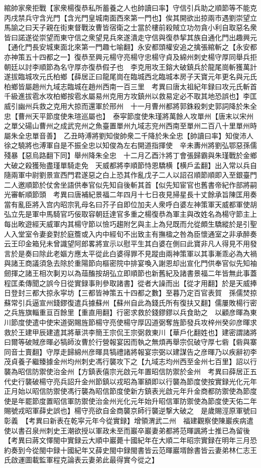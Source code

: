 綰帥家衆拒戰【家衆楊復恭私所蓄養之人也帥讀曰率】守信引兵助之順節等不能克丙戌禁兵守含光門【含光門皇城南面西來第一門也】俟其開欲出掠兩市遇劉崇望立馬諭之曰天子親在街東督戰汝曹皆宿衛之士當於樓前殺賊立功勿貪小利自取惡名衆皆曰諾遂從崇望而東守信之衆望見兵來遂潰走守信與復恭挈其族自通化門出趣興元【通化門長安城東面北來第一門趣七喻翻】永安都頭權安追之擒張綰斬之【永安都亦神策五十四都之一】復恭至興元楊守亮楊守忠楊守貞及綿州刺史楊守厚同舉兵拒朝廷以討李順節為名守厚亦復恭假子也　李克用攻王鎔大破鎮兵於龍尾崗斬獲萬計遂拔臨城攻元氏柏鄉【薛居正曰龍尾崗在臨城西北臨城本房子天寶元年更名與元氏柏鄉皆屬趙州九域志臨城在趙州西南一百三里　考異曰唐太祖紀年録曰攻元氏斬首千級進拔雹水攻柏鄉按雹水屬易州克用方攻鎮州以救易定必不取其地恐誤也】李匡威引幽州兵救之克用大掠而還軍於邢州　十一月曹州都將郭銖殺刺史郭詞降於朱全忠【曹州天平節度使朱瑄巡屬也】　泰寜節度使朱瑾將萬餘人攻單州【唐末以宋州之單父碭山曹州之成武兖州之魚臺置單州九域志兖州西南至單州二百八十里單州時屬朱全忠單音善】　乙丑時溥將劉知俊帥衆二千降於朱全忠【帥讀曰率】知俊沛人徐之驍將也溥軍自是不振全忠以知俊為左右開道指揮使　辛未夀州將劉弘鄂惡孫儒殘暴【惡烏路翻下同】舉州降朱全忠　十二月乙酉汴將丁會張歸霸與朱瑾戰於金鄉大破之殺獲殆盡瑾單騎走免　天威都將李順節恃恩驕横【横戶孟翻】出入常以兵自隨兩軍中尉劉景宣西門君遂惡之白上恐其作亂戊子二人以詔召順節順即入至銀臺門二人邀順節於仗舍坐語供奉官似先知自後斬其首【似先知宦官也舊書帝紀作部將嗣光審斬順節頭　考異曰唐補紀景福二年四月十七日夜見掃星長十丈餘承旨陳匡用奏當有亂臣將入宫内昭宗乳母名曰芥子自即位加夫人衆呼白婆左神策軍天威都軍使胡弘立先是軍中馬騎官巧佞取容朝廷達官多重之楊復恭為軍主與改姓名為楊守節主上每出畋遊經天威軍内其楊守節以憸巧趨附乞與主上為兒既而允從頗生驕縱於是引聖人入堂室令妻妾對於庭簷或入内中經旬不出致主有撫楹之咎為臣懷通室之非承醉奏云王印金箱兒未曾識望阿郎畧將宣示以慰平生其白婆在側曰此寶非凡人得見不用發言於是奏曰除此老嫗方應太平從此白婆得罪不見蹤由兩神策軍以其事漸乖必為大禍與諸王商議須急去除於重陽節向樞密院中排宴喚入謝恩却出宣化門供奉官似先知袖劒揮之諸王相次剚刃以為葅醢按胡弘立即順節也新舊紀及諸書景福二年皆無此事蓋程匡柔傳聞之誤今日從實録事則參取諸書】從者大譟而出【從才用翻】於是天威捧日登封三都大掠永寜坊【三都皆神策五十四都之數】至暮乃定百官表賀　孫儒焚掠蘇常引兵逼宣州錢鏐復遣兵據蘇州【蘇州自此為錢氏所有復扶又翻】儒屢敗楊行密之兵旌旗輜重亘百餘里【重直用翻】行密求救於錢鏐鏐以兵食助之　以顧彦暉為東川節度使遣中使宋道弼賜旌節楊守亮使楊守厚囚道弼奪旌節發兵攻梓州癸卯彦暉求救於王建甲辰建遣其將華洪李簡王宗侃王宗弼救東川【華戶化翻姓也】建密謂諸將曰爾等破賊彦暉必犒師汝曹於行營報宴因而執之無煩再舉宗侃破守厚七砦【砦與寨同音士賣翻】守厚走歸綿州彦暉具犒禮諸將報宴宗弼以建謀告之彦暉乃以疾辭初李茂貞養子繼臻據金州均州刺史馮行襲攻下之【九域志均州西至金州七百里】詔以行襲為昭信防禦使治金州【方鎮表僖宗光啟元年置昭信防禦於金州　考異曰薛居正五代史行襲破楊守亮兵詔升金州節鎮以戎昭為軍額即以行襲為節度使按實録光化元年正月始以昭信防禦使馮行襲為昭信節度使新方鎮表光啟元年升金商都防禦使為節度使是年罷節度置昭信軍防禦使治金州光化元年始升昭信軍防禦使為節度使天佑二年賜號戎昭軍薛史誤也】楊守亮欲自金商襲京師行襲逆撃大破之　是歲賜涇原軍號曰彰義　【考異曰新表在乾寜元年今從實録】增領渭武二州　福建觀察使陳巖疾病遣使以書召泉州刺史王潮欲授以軍政未至而巖卒巖妻弟都將范暉諷將士推已為留後　【考異曰蔣文懌閩中實録云大順中巖薨十國紀年在大順二年昭宗實録在明年三月恐約奏到今從閩中録十國紀年又薛史閩中録閩書皆云范暉巖壻餘書皆云妻弟林仁志王氏啟運圖載監軍程克論表云妻弟此最得實今從之】

